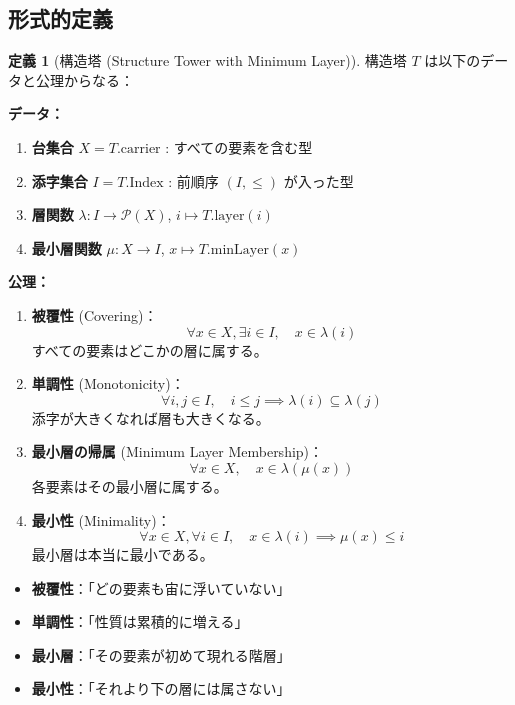 \documentclass[a4paper,11pt,ja=standard]{bxjsarticle}
\theoremstyle{definition}
\newtheorem{definition}{定義}[section]
\begin{document}
\subsection{形式的定義}

\begin{definition}[構造塔 (Structure Tower with Minimum Layer)]
構造塔 $T$ は以下のデータと公理からなる：

\textbf{データ：}
\begin{enumerate}
    \item \textbf{台集合} $X = T.\text{carrier}$ : すべての要素を含む型
    \item \textbf{添字集合} $I = T.\text{Index}$ : 前順序 $(I, \leq)$ が入った型
    \item \textbf{層関数} $\lambda : I \to \mathcal{P}(X)$, $i \mapsto T.\text{layer}(i)$
    \item \textbf{最小層関数} $\mu : X \to I$, $x \mapsto T.\text{minLayer}(x)$
\end{enumerate}

\textbf{公理：}
\begin{enumerate}
    \item \textbf{被覆性} (Covering)：
    \[
    \forall x \in X, \exists i \in I, \quad x \in \lambda(i)
    \]
    すべての要素はどこかの層に属する。

    \item \textbf{単調性} (Monotonicity)：
    \[
    \forall i, j \in I, \quad i \leq j \implies \lambda(i) \subseteq \lambda(j)
    \]
    添字が大きくなれば層も大きくなる。

    \item \textbf{最小層の帰属} (Minimum Layer Membership)：
    \[
    \forall x \in X, \quad x \in \lambda(\mu(x))
    \]
    各要素はその最小層に属する。

    \item \textbf{最小性} (Minimality)：
    \[
    \forall x \in X, \forall i \in I, \quad x \in \lambda(i) \implies \mu(x) \leq i
    \]
    最小層は本当に最小である。
\end{enumerate}
\end{definition}

\begin{intuition}
\begin{itemize}
    \item \textbf{被覆性}：「どの要素も宙に浮いていない」
    \item \textbf{単調性}：「性質は累積的に増える」
    \item \textbf{最小層}：「その要素が初めて現れる階層」
    \item \textbf{最小性}：「それより下の層には属さない」
\end{itemize}
\end{intuition}
\end{document}
